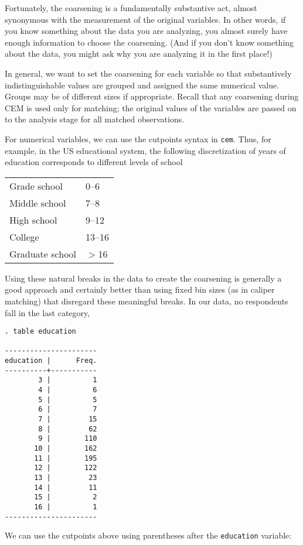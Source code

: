 \documentclass[11pt,titlepage]{article}
\begin{document}
Fortunately, the coarsening is a fundamentally substantive act, almost
synonymous with the measurement of the original variables.  In other
words, if you know something about the data you are analyzing, you
almost surely have enough information to choose the coarsening.  (And
if you don't know something about the data, you might ask why you are
analyzing it in the first place!) 

In general, we want to set the coarsening for each variable so that
substantively indistinguishable values are grouped and assigned the
same numerical value.  Groups may be of different sizes if
appropriate.  Recall that any coarsening during CEM is used only for
matching; the original values of the variables are passed on to the
analysis stage for all matched observations.

For numerical variables, we can use the cutpoints syntax in \texttt{cem}.
Thus, for example, in the US educational system, the following
discretization of years of education corresponds to different levels of
school
\begin{center}
\begin{tabular}{ll}
Grade school    & 0--6\\
Middle school   & 7--8\\
High school     & 9--12\\
College         & 13--16\\
Graduate school & $>$16 
\end{tabular}
\end{center}
Using these natural breaks in the data to create the coarsening is
generally a good approach and certainly better than using fixed bin sizes
(as in caliper matching) that disregard these meaningful breaks.  In our
data, no respondents fall in the last category,

\begin{verbatim}
. table education

----------------------
education |      Freq.
----------+-----------
        3 |          1
        4 |          6
        5 |          5
        6 |          7
        7 |         15
        8 |         62
        9 |        110
       10 |        162
       11 |        195
       12 |        122
       13 |         23
       14 |         11
       15 |          2
       16 |          1
----------------------

\end{verbatim}

We can use the cutpoints above using parentheses after the
\texttt{education} variable:
\end{document}
